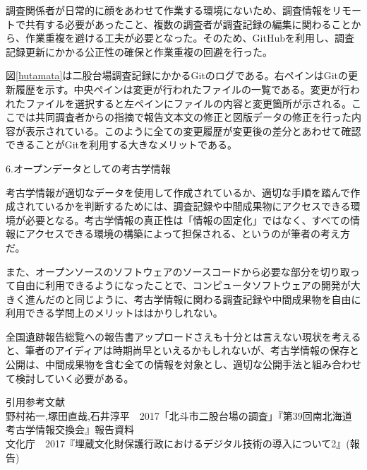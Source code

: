 \documentclass[9pt,b5j,papersize]{jsarticle}
\begin{document}
\begin{multicols}{2}
調査関係者が日常的に顔をあわせて作業する環境にないため、調査情報をリモートで共有する必要があったこと、複数の調査者が調査記録の編集に関わることから、作業重複を避ける工夫が必要となった。そのため、GitHubを利用し、調査記録更新にかかる公正性の確保と作業重複の回避を行った。

図\ref{hutamata}は二股台場調査記録にかかるGitのログである。右ペインはGitの更新履歴を示す。中央ペインは変更が行われたファイルの一覧である。変更が行われたファイルを選択すると左ペインにファイルの内容と変更箇所が示される。ここでは共同調査者からの指摘で報告文本文の修正と図版データの修正を行った内容が表示されている。このように全ての変更履歴が変更後の差分とあわせて確認できることがGitを利用する大きなメリットである。

\noindent
{\large 6.オープンデータとしての考古学情報}

考古学情報が適切なデータを使用して作成されているか、適切な手順を踏んで作成されているかを判断するためには、調査記録や中間成果物にアクセスできる環境が必要となる。考古学情報の真正性は「情報の固定化」ではなく、すべての情報にアクセスできる環境の構築によって担保される、というのが筆者の考え方だ。

また、オープンソースのソフトウェアのソースコードから必要な部分を切り取って自由に利用できるようになったことで、コンピュータソフトウェアの開発が大きく進んだのと同じように、考古学情報に関わる調査記録や中間成果物を自由に利用できる学問上のメリットははかりしれない。

全国遺跡報告総覧への報告書アップロードさえも十分とは言えない現状を考えると、筆者のアイディアは時期尚早といえるかもしれないが、考古学情報の保存と公開は、中間成果物を含む全ての情報を対象とし、適切な公開手法と組み合わせて検討していく必要がある。

\vspace{1\baselineskip}
\noindent
引用参考文献\\
野村祐一,塚田直哉,石井淳平　2017「北斗市二股台場の調査」『第39回南北海道考古学情報交換会』報告資料\\
文化庁　2017『埋蔵文化財保護行政におけるデジタル技術の導入について2』(報告)\\

\end{multicols}
\end{document}
